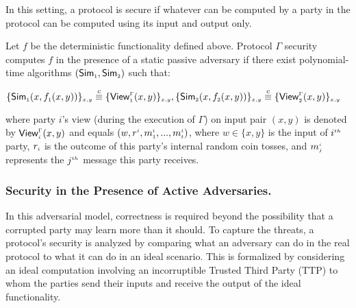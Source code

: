 In this setting, a protocol is secure if whatever can be computed by a party in the protocol can be computed using its input and output only. 
\begin{definition}
Let $f$ be the deterministic functionality defined above. Protocol $\Gamma$ security computes $f$ in the presence of a static  passive adversary if there exist polynomial-time algorithms $(\mathsf {Sim}_{\scriptscriptstyle 1}, \mathsf {Sim}_{\scriptscriptstyle 2})$ such that:
\end{definition}
%
\begin{center}
{\small{
$
  \{\mathsf {Sim}_{\scriptscriptstyle 1}(x,f_{\scriptscriptstyle 1}(x,y))\}_{\scriptscriptstyle x,y}\stackrel{c}{\equiv} \{\mathsf{View}_{\scriptscriptstyle 1}^{\scriptscriptstyle \Gamma}(x,y) \}_{\scriptscriptstyle x,y},
    \{\mathsf{Sim}_{\scriptscriptstyle 2}(x,f_{\scriptscriptstyle 2}(x,y))\}_{\scriptscriptstyle x,y}\stackrel{c}{\equiv} \{\mathsf{View}_{\scriptscriptstyle 2}^{\scriptscriptstyle \Gamma}(x,y) \}_{\scriptscriptstyle x,y}
$}}
  \end{center}
  where party $i$’s view (during the execution of $\Gamma$) on input pair  $(x, y)$ is denoted by $\mathsf{View}_{\scriptscriptstyle i}^{\scriptscriptstyle \Gamma}(x,y)$ and equals $(w, r^{\scriptscriptstyle i}, m_{\scriptscriptstyle 1}^{\scriptscriptstyle i}, ..., m_{\scriptscriptstyle t}^{\scriptscriptstyle i})$, where $w\in\{x,y\}$ is the input of $i^{\scriptscriptstyle th}$ party, $r_{\scriptscriptstyle i}$ is the outcome of this party's internal random coin tosses, and $m_{\scriptscriptstyle j}^{\scriptscriptstyle i}$ represents the $j^{\scriptscriptstyle th}$ message this party receives.  %

\vs
\vs
  
 \subsubsection{Security in the Presence of Active Adversaries.}  In this adversarial model, correctness is required beyond the possibility that a corrupted party may learn more than it should. To capture the threats,
a protocol's security is analyzed by comparing what an adversary can do in the real protocol to what it can do in an ideal scenario. This is formalized by considering an ideal computation involving an incorruptible Trusted Third Party (TTP) to whom the parties send their inputs and receive the output of the ideal functionality. %


